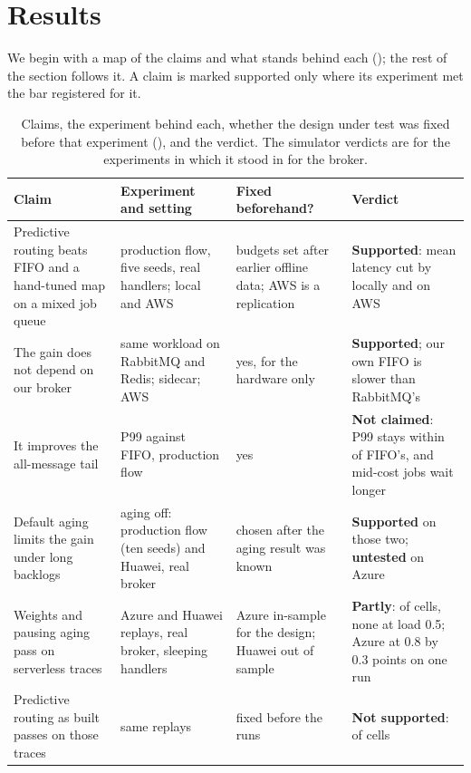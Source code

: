 \section{Results}\label{sec:results}

We begin with a map of the claims and what stands behind each (); the rest of the section follows it. A claim is marked supported only where its experiment met the bar registered for it.

\begin{table}[H]
\centering\footnotesize
\caption{Claims, the experiment behind each, whether the design under test was fixed before that experiment (), and the verdict. The simulator verdicts are for the experiments in which it stood in for the broker.}\label{tab:evidence}
\begin{tabularx}{\textwidth}{>{\raggedright\arraybackslash}p{4.3cm}>{\raggedright\arraybackslash}p{4.1cm}>{\raggedright\arraybackslash}p{2.6cm}L}
\toprule
{} \textbf{Claim} & \textbf{Experiment and setting} & \textbf{Fixed beforehand?} & \textbf{Verdict} \\
\midrule
Predictive routing beats FIFO and a hand-tuned map on a mixed job queue & production flow, five seeds, real handlers; local and AWS & budgets set after earlier offline data; AWS is a replication & \textbf{Supported}: mean latency cut by \VTwoMeanVsFifoAbs{} locally and \EOneMeanVsFifoAbs{} on AWS \\
The gain does not depend on our broker & same workload on RabbitMQ and Redis; sidecar; AWS & yes, for the hardware only & \textbf{Supported}; our own FIFO is \EThreeFifoGapAbs{} slower than RabbitMQ's \\
It improves the all-message tail & P99 against FIFO, production flow & yes & \textbf{Not claimed}: P99 stays within \EOnePNinetyNine{} of FIFO's, and mid-cost jobs wait longer \\
Default aging limits the gain under long backlogs & aging off: production flow (ten seeds) and Huawei, real broker & chosen after the aging result was known & \textbf{Supported} on those two; \textbf{untested} on Azure \\
Weights and pausing aging pass on serverless traces & Azure and Huawei replays, real broker, sleeping handlers & Azure in-sample for the design; Huawei out of sample & \textbf{Partly}: \ReplayGateBPassed{} of \ReplayCells{} cells, none at load 0.5; Azure at 0.8 by 0.3 points on one run \\
Predictive routing as built passes on those traces & same replays & fixed before the runs & \textbf{Not supported}: \ReplayGateAPassed{} of \ReplayCells{} cells \\

\end{tabularx}
\end{table}
